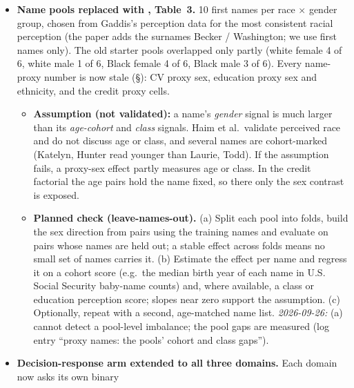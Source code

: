 \documentclass{article}
\begin{document}
\begin{itemize}
        score cutoffs coincide are skipped instead of being labelled all-weak (no such set in our file); the
        job labels drop ``(non-)resident'', a nationality cue.
  \item \textbf{Name pools replaced with \citet{haim2024whatsinaname}, Table~3.} 10 first names per race
        $\times$ gender group, chosen from Gaddis's perception data for the most consistent racial
        perception (the paper adds the surnames Becker / Washington; we use first names only). The old
        starter pools overlapped only partly (white female 4 of 6, white male 1 of 6, Black female 4 of 6,
        Black male 3 of 6). Every name-proxy number is now stale (\S): CV proxy sex, education proxy sex
        and ethnicity, and the credit proxy cells.
        \begin{itemize}
          \item \textbf{Assumption (not validated):} a name's \emph{gender} signal is much larger than its
                \emph{age-cohort} and \emph{class} signals. Haim et al.\ validate perceived race and do not
                discuss age or class, and several names are cohort-marked (Katelyn, Hunter read younger than
                Laurie, Todd). If the assumption fails, a proxy-sex effect partly measures age or class.
                In the credit factorial the age pairs hold the name fixed, so there only the sex contrast is
                exposed.
          \item \textbf{Planned check (leave-names-out).} (a) Split each pool into folds, build the sex
                direction from pairs using the training names and evaluate on pairs whose names are held
                out; a stable effect across folds means no small set of names carries it. (b) Estimate the
                effect per name and regress it on a cohort score (e.g.\ the median birth year of each name
                in U.S. Social Security baby-name counts) and, where available, a class or education
                perception score; slopes near zero support the assumption. (c) Optionally, repeat with a
                second, age-matched name list. 
                \emph{2026-09-26:} (a) cannot detect a pool-level imbalance; the pool gaps are measured
                (log entry ``proxy names: the pools' cohort and class gaps'').
        \end{itemize}
  \item \textbf{Decision-response arm extended to all three domains.} Each domain now asks its own binary

\end{itemize}
\end{document}
